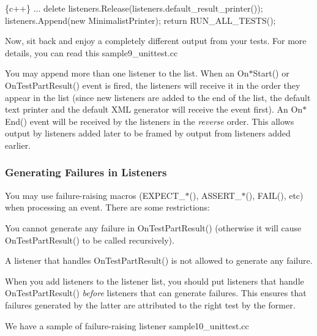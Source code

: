 \begin{DoxyCode}
\{c++\}
  ...
  delete listeners.Release(listeners.default\_result\_printer());
  listeners.Append(new MinimalistPrinter);
  return RUN\_ALL\_TESTS();
\end{DoxyCode}


Now, sit back and enjoy a completely different output from your tests. For more details, you can read this sample9\+\_\+unittest.\+cc

You may append more than one listener to the list. When an {\ttfamily On$\ast$\+Start()} or {\ttfamily On\+Test\+Part\+Result()} event is fired, the listeners will receive it in the order they appear in the list (since new listeners are added to the end of the list, the default text printer and the default X\+ML generator will receive the event first). An {\ttfamily On$\ast$\+End()} event will be received by the listeners in the {\itshape reverse} order. This allows output by listeners added later to be framed by output from listeners added earlier.

\subsubsection*{Generating Failures in Listeners}

You may use failure-\/raising macros ({\ttfamily E\+X\+P\+E\+C\+T\+\_\+$\ast$()}, {\ttfamily A\+S\+S\+E\+R\+T\+\_\+$\ast$()}, {\ttfamily F\+A\+I\+L()}, etc) when processing an event. There are some restrictions\+:


\begin{DoxyEnumerate}
\item You cannot generate any failure in {\ttfamily On\+Test\+Part\+Result()} (otherwise it will cause {\ttfamily On\+Test\+Part\+Result()} to be called recursively).
\end{DoxyEnumerate}
\begin{DoxyEnumerate}
\item A listener that handles {\ttfamily On\+Test\+Part\+Result()} is not allowed to generate any failure.
\end{DoxyEnumerate}

When you add listeners to the listener list, you should put listeners that handle {\ttfamily On\+Test\+Part\+Result()} {\itshape before} listeners that can generate failures. This ensures that failures generated by the latter are attributed to the right test by the former.

We have a sample of failure-\/raising listener sample10\+\_\+unittest.\+cc

